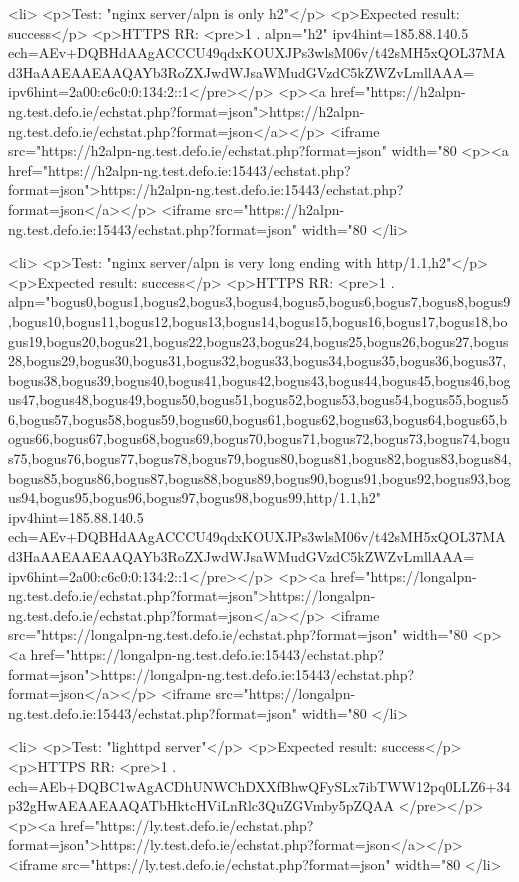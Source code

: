 <li>
<p>Test: "nginx server/alpn is only h2"</p>
<p>Expected result: success</p>
<p>HTTPS RR: <pre>1 . alpn="h2" ipv4hint=185.88.140.5 ech=AEv+DQBHdAAgACCCU49qdxKOUXJPs3wlsM06v/t42sMH5xQOL37MAd3HaAAEAAEAAQAYb3RoZXJwdWJsaWMudGVzdC5kZWZvLmllAAA= ipv6hint=2a00:c6c0:0:134:2::1</pre></p>
<p><a href="https://h2alpn-ng.test.defo.ie/echstat.php?format=json">https://h2alpn-ng.test.defo.ie/echstat.php?format=json</a></p>
<iframe src="https://h2alpn-ng.test.defo.ie/echstat.php?format=json" width="80%
<p><a href="https://h2alpn-ng.test.defo.ie:15443/echstat.php?format=json">https://h2alpn-ng.test.defo.ie:15443/echstat.php?format=json</a></p>
<iframe src="https://h2alpn-ng.test.defo.ie:15443/echstat.php?format=json" width="80%
</li>

<li>
<p>Test: "nginx server/alpn is very long ending with http/1.1,h2"</p>
<p>Expected result: success</p>
<p>HTTPS RR: <pre>1 . alpn="bogus0,bogus1,bogus2,bogus3,bogus4,bogus5,bogus6,bogus7,bogus8,bogus9,bogus10,bogus11,bogus12,bogus13,bogus14,bogus15,bogus16,bogus17,bogus18,bogus19,bogus20,bogus21,bogus22,bogus23,bogus24,bogus25,bogus26,bogus27,bogus28,bogus29,bogus30,bogus31,bogus32,bogus33,bogus34,bogus35,bogus36,bogus37,bogus38,bogus39,bogus40,bogus41,bogus42,bogus43,bogus44,bogus45,bogus46,bogus47,bogus48,bogus49,bogus50,bogus51,bogus52,bogus53,bogus54,bogus55,bogus56,bogus57,bogus58,bogus59,bogus60,bogus61,bogus62,bogus63,bogus64,bogus65,bogus66,bogus67,bogus68,bogus69,bogus70,bogus71,bogus72,bogus73,bogus74,bogus75,bogus76,bogus77,bogus78,bogus79,bogus80,bogus81,bogus82,bogus83,bogus84,bogus85,bogus86,bogus87,bogus88,bogus89,bogus90,bogus91,bogus92,bogus93,bogus94,bogus95,bogus96,bogus97,bogus98,bogus99,http/1.1,h2" ipv4hint=185.88.140.5 ech=AEv+DQBHdAAgACCCU49qdxKOUXJPs3wlsM06v/t42sMH5xQOL37MAd3HaAAEAAEAAQAYb3RoZXJwdWJsaWMudGVzdC5kZWZvLmllAAA= ipv6hint=2a00:c6c0:0:134:2::1</pre></p>
<p><a href="https://longalpn-ng.test.defo.ie/echstat.php?format=json">https://longalpn-ng.test.defo.ie/echstat.php?format=json</a></p>
<iframe src="https://longalpn-ng.test.defo.ie/echstat.php?format=json" width="80%
<p><a href="https://longalpn-ng.test.defo.ie:15443/echstat.php?format=json">https://longalpn-ng.test.defo.ie:15443/echstat.php?format=json</a></p>
<iframe src="https://longalpn-ng.test.defo.ie:15443/echstat.php?format=json" width="80%
</li>

<li>
<p>Test: "lighttpd server"</p>
<p>Expected result: success</p>
<p>HTTPS RR: <pre>1 . ech=AEb+DQBC1wAgACDhUNWChDXXfBhwQFySLx7ibTWW12pq0LLZ6+34p32gHwAEAAEAAQATbHktcHViLnRlc3QuZGVmby5pZQAA
</pre></p>
<p><a href="https://ly.test.defo.ie/echstat.php?format=json">https://ly.test.defo.ie/echstat.php?format=json</a></p>
<iframe src="https://ly.test.defo.ie/echstat.php?format=json" width="80%
</li>

